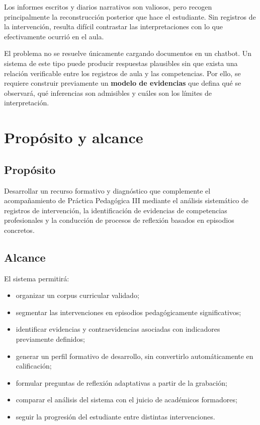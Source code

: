 \documentclass[11pt,a4paper]{article}
\begin{document}
Los informes escritos y diarios narrativos son valiosos, pero recogen principalmente la reconstrucción posterior que hace el estudiante. Sin registros de la intervención, resulta difícil contrastar las interpretaciones con lo que efectivamente ocurrió en el aula.

El problema no se resuelve únicamente cargando documentos en un chatbot. Un sistema de este tipo puede producir respuestas plausibles sin que exista una relación verificable entre los registros de aula y las competencias. Por ello, se requiere construir previamente un \textbf{modelo de evidencias} que defina qué se observará, qué inferencias son admisibles y cuáles son los límites de interpretación.

\section{Propósito y alcance}

\subsection{Propósito}

Desarrollar un recurso formativo y diagnóstico que complemente el acompañamiento de Práctica Pedagógica III mediante el análisis sistemático de registros de intervención, la identificación de evidencias de competencias profesionales y la conducción de procesos de reflexión basados en episodios concretos.

\subsection{Alcance}

El sistema permitirá:

\begin{itemize}
    \item organizar un corpus curricular validado;
    \item segmentar las intervenciones en episodios pedagógicamente significativos;
    \item identificar evidencias y contraevidencias asociadas con indicadores previamente definidos;
    \item generar un perfil formativo de desarrollo, sin convertirlo automáticamente en calificación;
    \item formular preguntas de reflexión adaptativas a partir de la grabación;
    \item comparar el análisis del sistema con el juicio de académicos formadores;
    \item seguir la progresión del estudiante entre distintas intervenciones.
\end{itemize}
\end{document}
